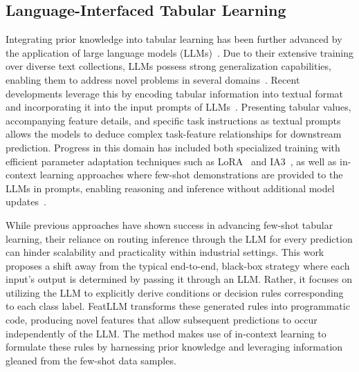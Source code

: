 \subsection{Language-Interfaced Tabular Learning}

Integrating prior knowledge into tabular learning has been further advanced by the application of large language models (LLMs)~\cite{anil2023palm,openai2023gpt4}. Due to their extensive training over diverse text collections, LLMs possess strong generalization capabilities, enabling them to address novel problems in several domains~\cite{brown2020language}. Recent developments leverage this by encoding tabular information into textual format and incorporating it into the input prompts of LLMs~\cite{dinh2022lift,hegselmann2023tabllm,wang2023anypredict}. Presenting tabular values, accompanying feature details, and specific task instructions as textual prompts allows the models to deduce complex task-feature relationships for downstream prediction. Progress in this domain has included both specialized training with efficient parameter adaptation techniques such as LoRA~\cite{hu2021lora} and IA3~\cite{liu2022few}, as well as in-context learning approaches where few-shot demonstrations are provided to the LLMs in prompts, enabling reasoning and inference without additional model updates~\cite{dinh2022lift,hegselmann2023tabllm,nam2023semi,slack2023tablet}.

While previous approaches have shown success in advancing few-shot tabular learning, their reliance on routing inference through the LLM for every prediction can hinder scalability and practicality within industrial settings. This work proposes a shift away from the typical end-to-end, black-box strategy where each input's output is determined by passing it through an LLM. Rather, it focuses on utilizing the LLM to explicitly derive conditions or decision rules corresponding to each class label. \textsf{FeatLLM} transforms these generated rules into programmatic code, producing novel features that allow subsequent predictions to occur independently of the LLM. The method makes use of in-context learning to formulate these rules by harnessing prior knowledge and leveraging information gleaned from the few-shot data samples.

